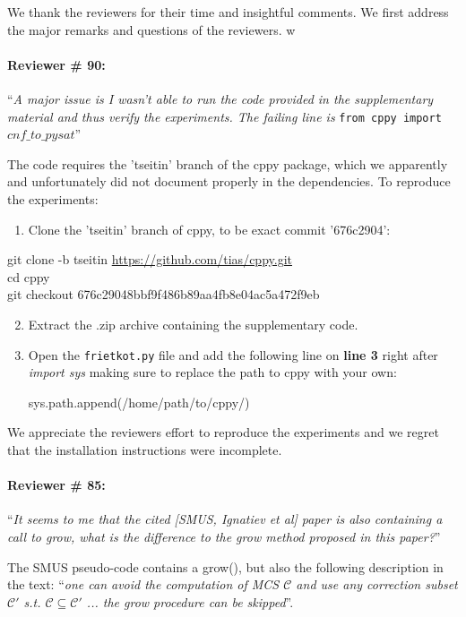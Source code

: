 \documentclass{article}
\begin{document}
We thank the reviewers for their time and insightful comments. We first address the major remarks and questions of the reviewers.  w

\paragraph{Reviewer \# 90:} ``\textit{A major issue is I wasn't able to run the code provided in the supplementary material and thus verify the experiments. The failing line is} \texttt{from cppy import $cnf\_to\_pysat$}''

The code requires the 'tseitin' branch of the cppy package, which we apparently and unfortunately did not document properly in the dependencies. To reproduce the experiments:
\begin{enumerate}
	\item Clone the 'tseitin' branch of cppy, to be exact commit '676c2904':
\end{enumerate}
{\footnotesize git clone -b tseitin \url{https://github.com/tias/cppy.git}}\\
{\footnotesize cd cppy} \\
{\footnotesize {git checkout 676c29048bbf9f486b89aa4fb8e04ac5a472f9eb}} 
\begin{enumerate}
	\setcounter{enumi}{1}
	\item Extract the .zip archive containing the supplementary code.
	\item Open the \texttt{frietkot.py} file and add the following line on \textbf{line 3} right after \emph{import sys} making sure to replace the path to cppy with your own:
	\begin{center}
	{ sys.path.append(\textquotesingle/home/path/to/cppy/\textquotesingle)}	
	\end{center}
\end{enumerate}
We appreciate the reviewers effort to reproduce the experiments and we regret that the installation instructions were incomplete.


\paragraph{Reviewer \# 85:} ``\textit{It seems to me that the cited [SMUS, Ignatiev et al] paper is also containing a call to grow, what is the difference to the grow method proposed in this paper?}''

The SMUS pseudo-code contains a grow(), but also the following description in the text: ``\emph{one can avoid the computation of MCS $\mathcal{C}$ and use any correction subset $\mathcal{C}'$ s.t. $\mathcal{C} \subseteq \mathcal{C}'$ ... the grow procedure can be skipped}''.
\end{document}
